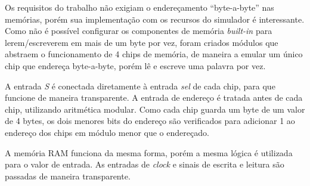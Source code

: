 \documentclass[twocolumn]{article}
\newcommand{\circuit}[1]{}
\begin{document}
Os requisitos do trabalho não exigiam o endereçamento ``byte-a-byte'' nas
memórias, porém sua implementação com os recursos do simulador é
interessante. Como não é possível configurar os componentes de memória
\textit{built-in} para lerem/escreverem em mais de um byte por vez, foram
criados módulos que abstraem o funcionamento de 4 chips de memória, de maneira a
emular um único chip que endereça byte-a-byte, porém lê e escreve uma palavra
por vez.

\circuit{rom}

A entrada \textit{S} é conectada diretamente à entrada \textit{sel} de cada
chip, para que funcione de maneira transparente. A entrada de endereço é tratada
antes de cada chip, utilizando aritmética modular. Como cada chip guarda um byte
de um valor de 4 bytes, os dois menores bits do endereço são verificados para
adicionar 1 ao endereço dos chips em módulo menor que o endereçado.

\circuit{ram}

A memória RAM funciona da mesma forma, porém a mesma lógica é utilizada para o
valor de entrada. As entradas de \textit{clock} e sinais de escrita e leitura são
passadas de maneira transparente.

{}

\end{document}
